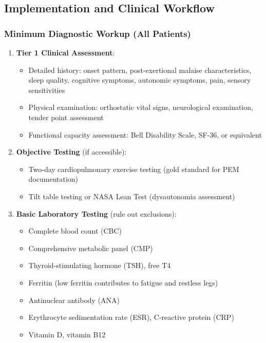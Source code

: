 \subsection{Implementation and Clinical Workflow}
\label{subsec:implementation}

\subsubsection{Minimum Diagnostic Workup (All Patients)}

\begin{enumerate}
    \item \textbf{Tier 1 Clinical Assessment}:
    \begin{itemize}
        \item Detailed history: onset pattern, post-exertional malaise characteristics, sleep quality, cognitive symptoms, autonomic symptoms, pain, sensory sensitivities
        \item Physical examination: orthostatic vital signs, neurological examination, tender point assessment
        \item Functional capacity assessment: Bell Disability Scale, SF-36, or equivalent
    \end{itemize}

    \item \textbf{Objective Testing} (if accessible):
    \begin{itemize}
        \item Two-day cardiopulmonary exercise testing (gold standard for PEM documentation)
        \item Tilt table testing or NASA Lean Test (dysautonomia assessment)
    \end{itemize}

    \item \textbf{Basic Laboratory Testing} (rule out exclusions):
    \begin{itemize}
        \item Complete blood count (CBC)
        \item Comprehensive metabolic panel (CMP)
        \item Thyroid-stimulating hormone (TSH), free T4
        \item Ferritin (low ferritin contributes to fatigue and restless legs)
        \item Antinuclear antibody (ANA)
        \item Erythrocyte sedimentation rate (ESR), C-reactive protein (CRP)
        \item Vitamin D, vitamin B12
    \end{itemize}


\end{enumerate}
